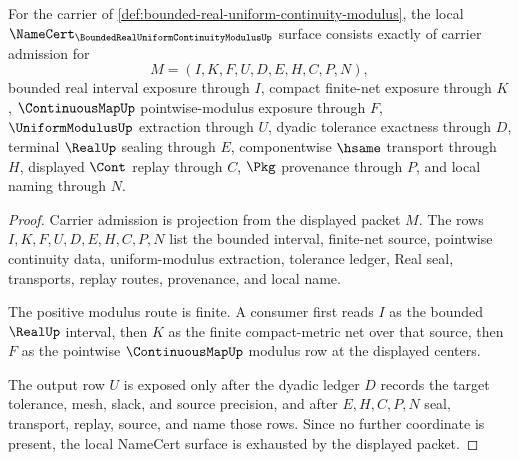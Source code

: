 \begin{theorem}
\label{thm:bounded-real-uniform-continuity-modulus-namecert-obligations}
For the carrier of \autoref{def:bounded-real-uniform-continuity-modulus}, the local $\NameCert_{\BoundedRealUniformContinuityModulusUp}$ surface consists exactly of carrier admission for
$$
M=(I,K,F,U,D,E,H,C,P,N),
$$
bounded real interval exposure through $I$, compact finite-net exposure through $K$, $\ContinuousMapUp$ pointwise-modulus exposure through $F$, $\UniformModulusUp$ extraction through $U$, dyadic tolerance exactness through $D$, terminal $\RealUp$ sealing through $E$, componentwise $\hsame$ transport through $H$, displayed $\Cont$ replay through $C$, $\Pkg$ provenance through $P$, and local naming through $N$.
\end{theorem}
\begin{proof}
Carrier admission is projection from the displayed packet $M$. The rows $I,K,F,U,D,E,H,C,P,N$ list the bounded interval, finite-net source, pointwise continuity data, uniform-modulus extraction, tolerance ledger, Real seal, transports, replay routes, provenance, and local name.

The positive modulus route is finite. A consumer first reads $I$ as the bounded $\RealUp$ interval, then $K$ as the finite compact-metric net over that source, then $F$ as the pointwise $\ContinuousMapUp$ modulus row at the displayed centers.

The output row $U$ is exposed only after the dyadic ledger $D$ records the target tolerance, mesh, slack, and source precision, and after $E,H,C,P,N$ seal, transport, replay, source, and name those rows. Since no further coordinate is present, the local NameCert surface is exhausted by the displayed packet.
\end{proof}

